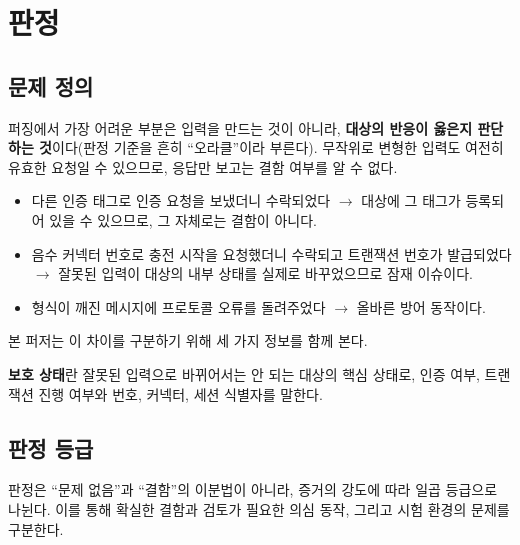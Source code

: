 \clearpage

\section{판정}\label{sec:oracle}

\subsection{문제 정의}

퍼징에서 가장 어려운 부분은 입력을 만드는 것이 아니라, \textbf{대상의 반응이 옳은지 판단하는 것}이다(판정 기준을 흔히 ``오라클''이라 부른다).
무작위로 변형한 입력도 여전히 유효한 요청일 수 있으므로, 응답만 보고는 결함 여부를 알 수 없다.

\begin{itemize}
    \item 다른 인증 태그로 인증 요청을 보냈더니 수락되었다 $\rightarrow$ 대상에 그 태그가 등록되어 있을 수 있으므로, 그 자체로는 결함이 아니다.
    \item 음수 커넥터 번호로 충전 시작을 요청했더니 수락되고 트랜잭션 번호가 발급되었다 $\rightarrow$ 잘못된 입력이 대상의 내부 상태를 실제로 바꾸었으므로 잠재 이슈이다.
    \item 형식이 깨진 메시지에 프로토콜 오류를 돌려주었다 $\rightarrow$ 올바른 방어 동작이다.
\end{itemize}

본 퍼저는 이 차이를 구분하기 위해 세 가지 정보를 함께 본다.

\begin{center}
\end{center}

\textbf{보호 상태}란 잘못된 입력으로 바뀌어서는 안 되는 대상의 핵심 상태로, 인증 여부, 트랜잭션 진행 여부와 번호, 커넥터, 세션 식별자를 말한다.

\subsection{판정 등급}

판정은 ``문제 없음''과 ``결함''의 이분법이 아니라, 증거의 강도에 따라 일곱 등급으로 나뉜다.
이를 통해 확실한 결함과 검토가 필요한 의심 동작, 그리고 시험 환경의 문제를 구분한다.

